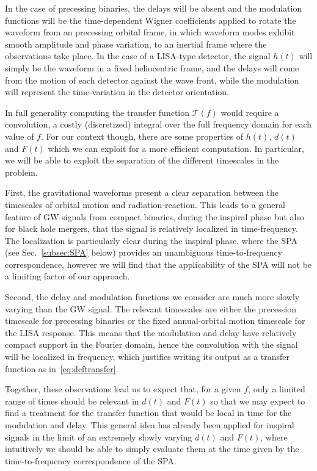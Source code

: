 \documentclass[aps,showpacs,twocolumn,
prd,superscriptaddress,nofootinbib]{revtex4-1}
\newcommand\calT{{\mathcal{T}}}
\newcommand{\jgb}[1]{{\color{DarkGreen} #1}}
\begin{document}
In the case of precessing binaries, the delays will be absent and the modulation functions will be the time-dependent Wigner coefficients applied to rotate the waveform from an \jgb{precessing orbital frame, in which waveform modes exhibit smooth amplitude and phase variation}, to an inertial frame where the observations take place. In the case of a LISA-type detector, the signal $h(t)$ will simply be the waveform in a fixed heliocentric frame, and the delays will come from the motion of each detector against the wave front, while the modulation will represent the time-variation in the detector orientation.

In full generality computing the transfer function $\calT(f)$ would require a convolution, a costly (discretized) integral over the full frequency domain for each value of $f$. For our context though, there are some properties of $h(t)$, $d(t)$ and $F(t)$ which we can exploit for a more efficient computation. In particular, we will be able to exploit the separation of the different timescales in the problem.

First, the gravitational waveforms present a clear separation between the timescales of orbital motion and radiation-reaction. This leads to a general feature of GW signals from compact binaries, during the inspiral phase but also for black hole mergers, that the signal is relatively localized in time-frequency. The localization is particularly clear during the inspiral phase, where the SPA (see Sec.~\ref{subsec:SPA} below) provides an unambiguous time-to-frequency correspondence, however we will find that the applicability of the SPA will not be a limiting factor of our approach.

Second, the delay and modulation functions we consider are much more slowly varying than the GW signal. The relevant timescales are either the precession timescale for precessing binaries or the fixed annual-orbital motion timescale for the LISA response. This means that the modulation and delay have relatively compact support in the Fourier domain, hence the convolution with the signal will be localized in frequency, which justifies writing its output as a transfer function as in~\eqref{eq:deftransfer}.

Together, these observations lead us to expect that, for a given $f$, only a limited range of times should be relevant in $d(t)$ and $F(t)$ so that we may expect to find a treatment for the transfer function that would be local in time for the modulation and delay. This general idea has already been applied for inspiral signals in the limit of an extremely slowly varying $d(t)$ and $F(t)$, where intuitively we should be able to simply evaluate them at the time given by the time-to-frequency correspondence of the SPA.
\end{document}
